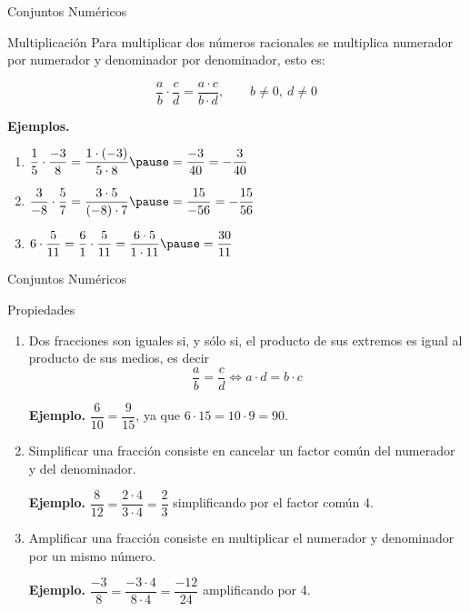\documentclass[aspectratio=169,handout,11pt]{beamer}
\begin{document}
	\begin{frame}{Conjuntos Numéricos}
		\begin{block}{Multiplicación}
			Para multiplicar dos números racionales se multiplica numerador por numerador y denominador por denominador, esto es:
			\pause
			
			\[
			\frac{a}{b}\cdot\frac{c}{d}=\frac{a\cdot c}{b\cdot d},
			\qquad b\neq0,\ d\neq0
			\]
			\pause
			
			\textbf{Ejemplos.}
			\begin{enumerate}
				\item $\dfrac{1}{5}\cdot\dfrac{-3}{8}
				=
				\dfrac{1\cdot(-3)}{5\cdot8}
				\pause
				=
				\dfrac{-3}{40}
				=
				-\dfrac{3}{40}$
				\pause
				
				\item $\dfrac{3}{-8}\cdot\dfrac{5}{7}
				=
				\dfrac{3\cdot5}{(-8)\cdot7}
				\pause
				=
				\dfrac{15}{-56}
				=
				-\dfrac{15}{56}$
				\pause
				
				\item $6\cdot\dfrac{5}{11}
				=
				\dfrac{6}{1}\cdot\dfrac{5}{11}
				=
				\dfrac{6\cdot5}{1\cdot11}
				\pause
				=
				\dfrac{30}{11}$
			\end{enumerate}
		\end{block}
	\end{frame}
	
	\begin{frame}{Conjuntos Numéricos}
		\small{
		\begin{block}{Propiedades}
			\begin{enumerate}
				\item Dos fracciones son iguales si, y sólo si, el producto de sus extremos es igual al producto de sus medios, es decir
				\[
				\frac{a}{b}=\frac{c}{d}\Longleftrightarrow a\cdot d=b\cdot c
				\]
				
				\textbf{Ejemplo.} $\dfrac{6}{10}=\dfrac{9}{15}$, ya que $6\cdot15=10\cdot9=90$.
				
				\item Simplificar una fracción consiste en cancelar un factor común del numerador y del denominador.
				
				\textbf{Ejemplo.}
				$
				\dfrac{8}{12}=\dfrac{2\cdot4}{3\cdot4}=\dfrac{2}{3}
				$
				simplificando por el factor común 4.
				
				\item Amplificar una fracción consiste en multiplicar el numerador y denominador por un mismo número.
				
				\textbf{Ejemplo.} $
				\dfrac{-3}{8}=\dfrac{-3\cdot4}{8\cdot4}=\dfrac{-12}{24}
				$
				amplificando por 4.
			\end{enumerate}
		\end{block}
	}
	\end{frame}
	
\end{document}
